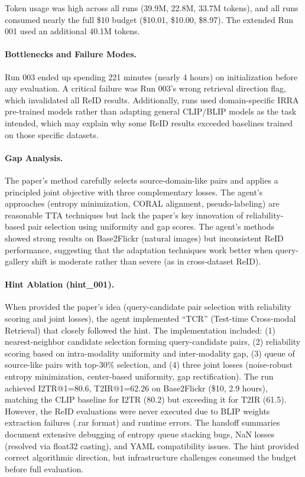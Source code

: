 \documentclass[11pt]{article}
\theoremstyle{plain}
\theoremstyle{definition}
\theoremstyle{remark}
\begin{document}
Token usage was high across all runs (39.9M, 22.8M, 33.7M tokens), and all runs consumed nearly the full \$10 budget (\$10.01, \$10.00, \$8.97). The extended Run 001 used an additional 40.1M tokens.

\paragraph{Bottlenecks and Failure Modes.} Run 003 ended up spending 221 minutes (nearly 4 hours) on initialization before any evaluation. A critical failure was Run 003's wrong retrieval direction flag, which invalidated all ReID results. Additionally, runs used domain-specific IRRA pre-trained models rather than adapting general CLIP/BLIP models as the task intended, which may explain why some ReID results exceeded baselines trained on those specific datasets.

\paragraph{Gap Analysis.} The paper's method carefully selects source-domain-like pairs and applies a principled joint objective with three complementary losses. The agent's approaches (entropy minimization, CORAL alignment, pseudo-labeling) are reasonable TTA techniques but lack the paper's key innovation of reliability-based pair selection using uniformity and gap scores. The agent's methods showed strong results on Base2Flickr (natural images) but inconsistent ReID performance, suggesting that the adaptation techniques work better when query-gallery shift is moderate rather than severe (as in cross-dataset ReID).

\paragraph{Hint Ablation (hint\_001).} When provided the paper's idea (query-candidate pair selection with reliability scoring and joint losses), the agent implemented ``TCR'' (Test-time Cross-modal Retrieval) that closely followed the hint. The implementation included: (1) nearest-neighbor candidate selection forming query-candidate pairs, (2) reliability scoring based on intra-modality uniformity and inter-modality gap, (3) queue of source-like pairs with top-30\% selection, and (4) three joint losses (noise-robust entropy minimization, center-based uniformity, gap rectification). The run achieved I2TR@1=80.6, T2IR@1=62.26 on Base2Flickr (\$10, 2.9 hours), matching the CLIP baseline for I2TR (80.2) but exceeding it for T2IR (61.5). However, the ReID evaluations were never executed due to BLIP weights extraction failures (.rar format) and runtime errors. The handoff summaries document extensive debugging of entropy queue stacking bugs, NaN losses (resolved via float32 casting), and YAML compatibility issues. The hint provided correct algorithmic direction, but infrastructure challenges consumed the budget before full evaluation.
\end{document}
